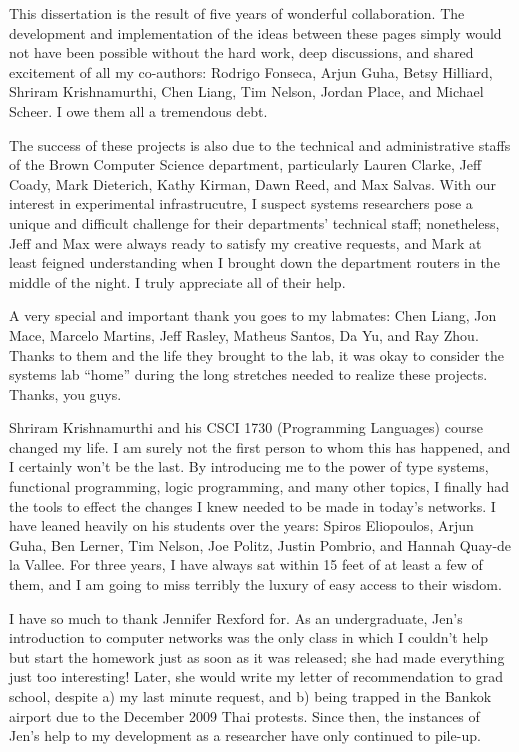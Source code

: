 

This dissertation is the result of five years of wonderful collaboration.
The development and implementation of the ideas between these pages simply
would not have been possible without the hard work, deep discussions, and
shared excitement of all my co-authors: Rodrigo Fonseca, Arjun Guha, Betsy Hilliard,
Shriram Krishnamurthi, Chen Liang, Tim Nelson, Jordan Place, and Michael
Scheer. I owe them all a tremendous debt.

The success of these projects is also due to the technical and administrative
staffs of the Brown Computer Science department, particularly Lauren
Clarke, Jeff Coady, Mark Dieterich, Kathy Kirman, Dawn Reed, and Max Salvas.
With our interest in experimental infrastrucutre, I suspect systems researchers
pose a unique and difficult challenge for their departments' technical staff;
nonetheless, Jeff and Max were always ready to satisfy my creative requests,
and Mark at least feigned understanding when I brought down the department
routers in the middle of the night. I truly appreciate all of their help.

A very special and important thank you goes to my labmates:
Chen Liang, Jon Mace, Marcelo Martins, Jeff Rasley, Matheus Santos, Da Yu,
and Ray Zhou. Thanks to them and the life they brought to the lab, it was
okay to consider the systems lab ``home'' during the long stretches needed to
realize these projects. Thanks, you guys.

Shriram Krishnamurthi and his CSCI 1730 (Programming Languages) course
changed my life. I am surely not the first person to whom this has happened,
and I certainly won't be the last. By introducing me to the power of
type systems, functional programming, logic programming, and many other
topics, I finally had the tools to effect the changes I knew needed to
be made in today's networks. I have leaned heavily on his students over
the years: Spiros Eliopoulos, Arjun Guha, Ben Lerner, Tim Nelson, Joe Politz,
Justin Pombrio, and Hannah Quay-de la Vallee. For three years, I have always
sat within 15 feet of at least a few of them, and I am going to miss
terribly the luxury of easy access to their wisdom.

I have so much to thank Jennifer Rexford for. As an undergraduate, Jen's
introduction to computer networks was the only class in which I couldn't help
but start the homework just as soon as it was released; she had made everything
just too interesting! Later, she would write my letter of recommendation to
grad school, despite a) my last minute request, and b) being trapped in the
Bankok airport due to the December 2009 Thai protests. Since then, the instances 
of Jen's help to my development as a researcher have only continued to pile-up.

